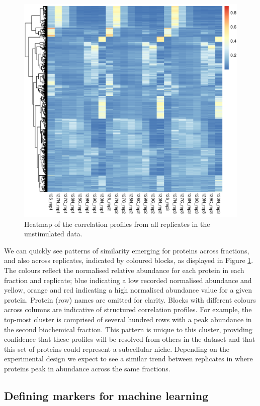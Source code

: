 \documentclass[9pt,a4paper,]{extarticle}
\begin{document}
\begin{figure}[H]

{\centering \includegraphics[width=0.7\linewidth,]{figs/heatmap_protein_quant} 

}

\caption{Heatmap of the correlation profiles from all replicates in the unstimulated data.}\label{fig:heatmap-lopit}
\end{figure}

We can quickly see patterns of similarity emerging for proteins across
fractions, and also across replicates, indicated by coloured blocks, as
displayed in Figure \ref{fig:heatmap-lopit}. The colours reflect the normalised
relative abundance for each protein in each fraction and replicate; blue
indicating a low recorded normalised abundance and yellow, orange and red
indicating a high normalised abundance value for a given protein. Protein (row)
names are omitted for clarity. Blocks with different colours across columns are
indicative of structured correlation profiles. For example, the top-most cluster
is comprised of several hundred rows with a peak abundance in the second
biochemical fraction. This pattern is unique to this cluster, providing
confidence that these profiles will be resolved from others in the dataset and
that this set of proteins could represent a subcellular niche. Depending on the
experimental design we expect to see a similar trend between replicates in where
proteins peak in abundance across the same fractions.

\subsection{Defining markers for machine learning}\label{defining-markers-for-machine-learning}
\end{document}
